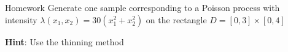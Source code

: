 \documentclass[8pt]{beamer}
\begin{document}




\begin{frame}{Homework}
Generate one sample corresponding to a Poisson process with  intensity 
$\lambda(x_1,x_2)=30(x_1^2+x_2^2)$ on the rectangle $D=[0,3]\times[0,4]$

\vspace{3mm}

\textbf{Hint}: Use the thinning method
\end{frame}
\end{document}

